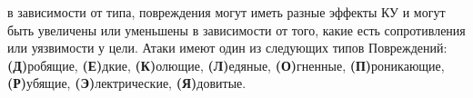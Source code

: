 в зависимости от типа, повреждения могут иметь разные эффекты КУ и могут быть увеличены или уменьшены в зависимости от того, какие есть сопротивления или уязвимости у цели. Атаки имеют один из следующих типов Повреждений:
\newline
\textbf{(Д)}робящие, \textbf{(Е)}дкие, \textbf{(К)}олющие, \textbf{(Л)}едяные, \textbf{(О)}гненные, \textbf{(П)}роникающие, \textbf{(Р)}убящие, \textbf{(Э)}лектрические, \textbf{(Я)}довитые.